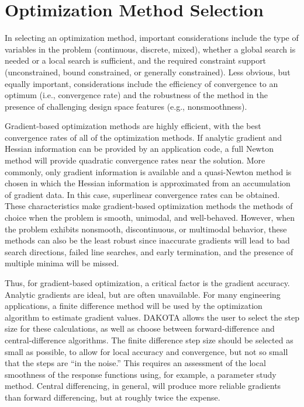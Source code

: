 \section{Optimization Method Selection}\label{usage:selection}

In selecting an optimization method, important considerations include
the type of variables in the problem (continuous, discrete, mixed),
whether a global search is needed or a local search is sufficient, and
the required constraint support (unconstrained, bound constrained,
or generally constrained). Less obvious, but equally important,
considerations include the efficiency of convergence to an optimum
(i.e., convergence rate) and the robustness of the method in the
presence of challenging design space features (e.g., nonsmoothness).

Gradient-based optimization methods are highly efficient, with the
best convergence rates of all of the optimization methods. If analytic
gradient and Hessian information can be provided by an application
code, a full Newton method will provide quadratic convergence rates
near the solution. More commonly, only gradient information is
available and a quasi-Newton method is chosen in which the Hessian
information is approximated from an accumulation of gradient data. In
this case, superlinear convergence rates can be obtained. These
characteristics make gradient-based optimization methods the methods
of choice when the problem is smooth, unimodal, and
well-behaved. However, when the problem exhibits nonsmooth,
discontinuous, or multimodal behavior, these methods can also be the
least robust since inaccurate gradients will lead to bad search
directions, failed line searches, and early termination, and the
presence of multiple minima will be missed.

Thus, for gradient-based optimization, a critical factor is the
gradient accuracy. Analytic gradients are ideal, but are often
unavailable. For many engineering applications, a finite difference
method will be used by the optimization algorithm to estimate gradient
values. DAKOTA allows the user to select the step size for these
calculations, as well as choose between forward-difference and
central-difference algorithms. The finite difference step size should
be selected as small as possible, to allow for local accuracy and
convergence, but not so small that the steps are ``in the noise.'' 
This requires an assessment of the local smoothness of the response
functions using, for example, a parameter study method.  Central
differencing, in general, will produce more reliable gradients than
forward differencing, but at roughly twice the expense.

